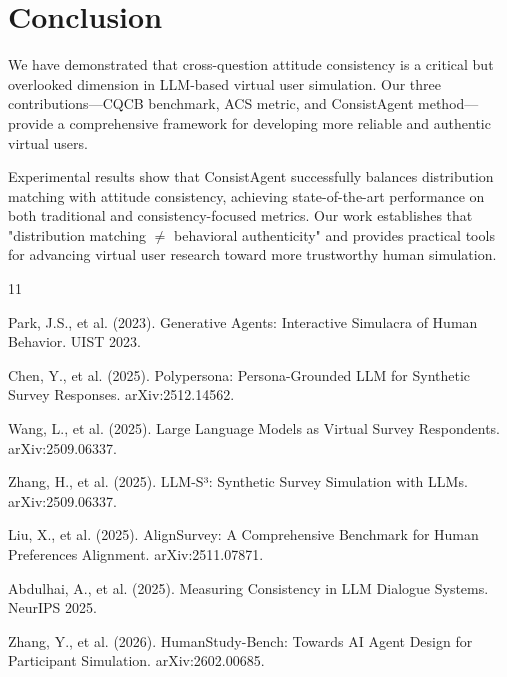 \documentclass{article}
\begin{document}
\section{Conclusion}

We have demonstrated that cross-question attitude consistency is a critical but overlooked dimension in LLM-based virtual user simulation. Our three contributions—CQCB benchmark, ACS metric, and ConsistAgent method—provide a comprehensive framework for developing more reliable and authentic virtual users.

Experimental results show that ConsistAgent successfully balances distribution matching with attitude consistency, achieving state-of-the-art performance on both traditional and consistency-focused metrics. Our work establishes that "distribution matching $\neq$ behavioral authenticity" and provides practical tools for advancing virtual user research toward more trustworthy human simulation.


\begin{thebibliography}{11}

Park, J.S., et al. (2023). Generative Agents: Interactive Simulacra of Human Behavior. UIST 2023.

Chen, Y., et al. (2025). Polypersona: Persona-Grounded LLM for Synthetic Survey Responses. arXiv:2512.14562.

Wang, L., et al. (2025). Large Language Models as Virtual Survey Respondents. arXiv:2509.06337.

Zhang, H., et al. (2025). LLM-S³: Synthetic Survey Simulation with LLMs. arXiv:2509.06337.

Liu, X., et al. (2025). AlignSurvey: A Comprehensive Benchmark for Human Preferences Alignment. arXiv:2511.07871.

Abdulhai, A., et al. (2025). Measuring Consistency in LLM Dialogue Systems. NeurIPS 2025.

Zhang, Y., et al. (2026). HumanStudy-Bench: Towards AI Agent Design for Participant Simulation. arXiv:2602.00685.

\end{thebibliography}
\end{document}
